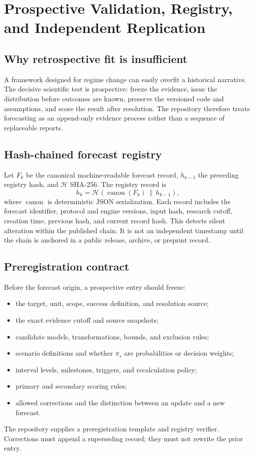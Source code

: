 \section{Prospective Validation, Registry, and Independent Replication}
\label{sec:validation-program}

\subsection{Why retrospective fit is insufficient}

A framework designed for regime change can easily overfit a historical narrative. The decisive scientific test is prospective: freeze the evidence, issue the distribution before outcomes are known, preserve the versioned code and assumptions, and score the result after resolution. The repository therefore treats forecasting as an append-only evidence process rather than a sequence of replaceable reports.

\subsection{Hash-chained forecast registry}

Let $F_k$ be the canonical machine-readable forecast record, $h_{k-1}$ the preceding registry hash, and $\mathcal H$ SHA-256. The registry record is
\begin{equation}
h_k=\mathcal H\!\left(\operatorname{canon}(F_k)\,\|\,h_{k-1}\right),
\end{equation}
where $\operatorname{canon}$ is deterministic JSON serialization. Each record includes the forecast identifier, protocol and engine versions, input hash, research cutoff, creation time, previous hash, and current record hash. This detects silent alteration within the published chain. It is not an independent timestamp until the chain is anchored in a public release, archive, or preprint record.

\subsection{Preregistration contract}

Before the forecast origin, a prospective entry should freeze:
\begin{itemize}
\item the target, unit, scope, success definition, and resolution source;
\item the exact evidence cutoff and source snapshots;
\item candidate models, transformations, bounds, and exclusion rules;
\item scenario definitions and whether $\pi_s$ are probabilities or decision weights;
\item interval levels, milestones, triggers, and recalculation policy;
\item primary and secondary scoring rules;
\item allowed corrections and the distinction between an update and a new forecast.
\end{itemize}
The repository supplies a preregistration template and registry verifier. Corrections must append a superseding record; they must not rewrite the prior entry.

